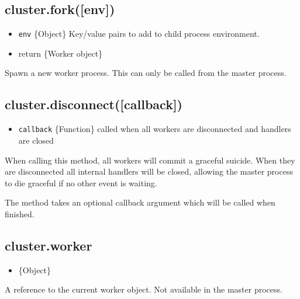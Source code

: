 \subsection{cluster.fork({[}env{]})}

\begin{itemize}
\item
  \texttt{env} \{Object\} Key/value pairs to add to child process
  environment.
\item
  return \{Worker object\}
\end{itemize}

Spawn a new worker process. This can only be called from the master
process.

\subsection{cluster.disconnect({[}callback{]})}

\begin{itemize}
\item
  \texttt{callback} \{Function\} called when all workers are
  disconnected and handlers are closed
\end{itemize}

When calling this method, all workers will commit a graceful suicide.
When they are disconnected all internal handlers will be closed,
allowing the master process to die graceful if no other event is
waiting.

The method takes an optional callback argument which will be called when
finished.

\subsection{cluster.worker}

\begin{itemize}
\item
  \{Object\}
\end{itemize}

A reference to the current worker object. Not available in the master
process.

\begin{Shaded}
\begin{Highlighting}[]
 \NormalTok{);}

 \NormalTok{(}\NormalTok{) \{}
  \NormalTok{(}\NormalTok{);}
  \NormalTok{();}
  \NormalTok{();}
\NormalTok{\} }  \NormalTok{(}\NormalTok{) \{}
  \NormalTok{(} \NormalTok{+ }\NormalTok{);}
\NormalTok{\}}
\end{Highlighting}
\end{Shaded}

